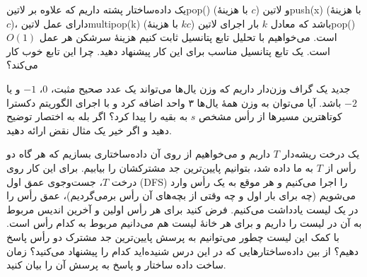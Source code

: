 
یک داده‌ساختار پشته داریم که علاوه بر ‌لاتین{pop()} (با هزینۀ $c$) و ‌لاتین{push(x)} (با هزینۀ $c$)، دارای عمل ‌لاتین{multipop(k)} (با هزینۀ $kc$) باشد که معادل $k$ بار اجرای ‌لاتین{pop()} است. می‌خواهیم با تحلیل تابع پتانسیل ثابت کنیم هزینۀ سرشکن هر عمل $O(1)$ است. یک تابع پتانسیل مناسب برای این کار پیشنهاد دهید.
چرا این تابع خوب کار می‌کند؟

‌جدید
یک گراف وزن‌دار داریم که وزن یال‌ها می‌تواند یک عدد صحیح مثبت، $0$، $-1$ و یا $-2$ باشد. آیا می‌توان به وزن همۀ یال‌ها ۳ واحد اضافه کرد و با اجرای الگوریتم دکسترا کوتاهترین مسیرها از رأس مشخص $s$ به بقیه را پیدا کرد؟ اگر بله به اختصار توضیح دهید و اگر خیر یک مثال نقض ارائه دهید.


یک درخت ریشه‌دار $T$ داریم و می‌خواهیم از روی آن داده‌ساختاری بسازیم که هر گاه دو رأس از $T$ به ما داده شد، بتوانیم پایین‌ترین جد مشترکشان را بیابیم. برای این کار روی درخت $T$، جست‌وجوی عمق اول (DFS) را اجرا می‌کنیم و هر موقع به یک رأس وارد می‌شویم (چه برای بار اول و چه وقتی از بچه‌های آن رأس برمی‌گردیم)، عمق رأس را در یک لیست یادداشت می‌کنیم. فرض کنید برای هر رأس اولین و آخرین اندیس مربوط به آن در لیست را داریم و برای هر خانۀ لیست هم می‌دانیم مربوط به کدام رأس است. با کمک این لیست چطور می‌توانیم به پرسش پایین‌ترین جد مشترک دو رأس پاسخ دهیم؟ از بین داده‌ساختارهایی که در این درس شنیده‌اید کدام را پیشنهاد می‌کنید؟ زمان ساخت داده ساختار و پاسخ به پرسش آن را بیان کنید.


